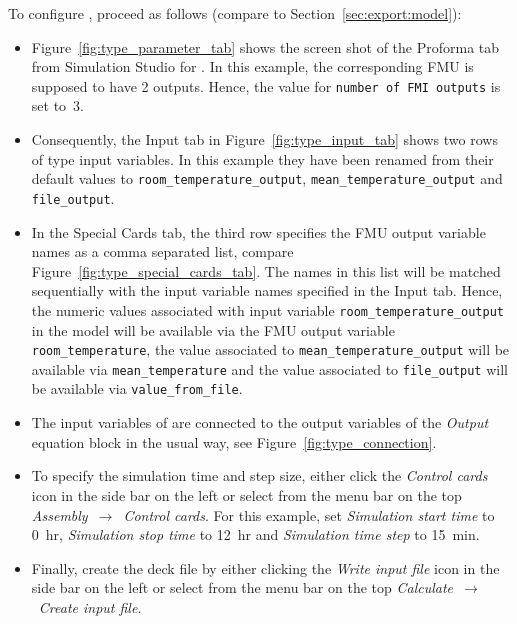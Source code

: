 To configure \typeb, proceed as follows (compare to Section~\ref{sec:export:model}):
\begin{itemize}
  \item Figure~\ref{fig:type_parameter_tab} shows the screen shot of the Proforma tab from Simulation Studio for \typeb.
  In this example, the corresponding FMU is supposed to have 2 outputs.
  Hence, the value for \texttt{number of FMI outputs} is set to~3.

  \item Consequently, the Input tab in Figure~\ref{fig:type_input_tab} shows two rows of type input variables.
  In this example they have been renamed from their default values to \texttt{room\_temperature\_output}, \texttt{mean\_temperature\_output} and \texttt{file\_output}.

  \item In the Special Cards tab, the third row specifies the FMU output variable names as a comma separated list, compare Figure~\ref{fig:type_special_cards_tab}.
  The names in this list will be matched sequentially with the input variable names specified in the Input tab.
  Hence, the numeric values associated with \typeb input variable \texttt{room\_temperature\_output} in the \trnsys model will be available via the FMU output variable \texttt{room\_temperature}, the value associated to \texttt{mean\_temperature\_output} will be available via \texttt{mean\_temperature} and the value associated to \texttt{file\_output} will be available via \texttt{value\_from\_file}.

  \item The input variables of \typeb are connected to the output variables of the \emph{Output} equation block in the usual way, see Figure~\ref{fig:type_connection}.

  \item To specify the simulation time and step size, either click the \textit{Control cards} icon in the side bar on the left or select from the menu bar on the top \textit{Assembly}~$\rightarrow$~\textit{Control cards}.
  For this example, set \textit{Simulation start time} to 0~hr, \textit{Simulation stop time} to 12~hr and \textit{Simulation time step} to 15~min.

  \item Finally, create the deck file by either clicking the \textit{Write input file} icon in the side bar on the left or select from the menu bar on the top \textit{Calculate}~$\rightarrow$~\textit{Create input file}.

\end{itemize}

